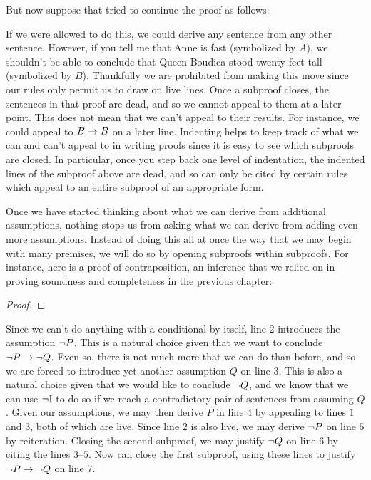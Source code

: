 But now suppose that tried to continue the proof as follows:
\begin{fitchproof}
	 \pr{}
	\open
		 
		 
	\close
	 
\end{fitchproof}
If we were allowed to do this, we could derive any sentence from any other sentence.
However, if you tell me that Anne is fast (symbolized by $A$), we shouldn't be able to conclude that Queen Boudica stood twenty-feet tall (symbolized by $B$).
Thankfully we are prohibited from making this move since our rules only permit us to draw on live lines.
Once a subproof closes, the sentences in that proof are dead, and so we cannot appeal to them at a later point.
This does not mean that we can't appeal to their results.
For instance, we could appeal to $B \rightarrow B$ on a later line. 
Indenting helps to keep track of what we can and can't appeal to in writing proofs since it is easy to see which subproofs are closed.
In particular, once you step back one level of indentation, the indented lines of the subproof above are dead, and so can only be cited by certain rules which appeal to an entire subproof of an appropriate form.

Once we have started thinking about what we can derive from additional assumptions, nothing stops us from asking what we can derive from adding even more assumptions.
Instead of doing this all at once the way that we may begin with many premises, we will do so by opening subproofs within subproofs.
For instance, here is a proof of contraposition, an inference that we relied on in proving soundness and completeness in the previous chapter:

\begin{proof}
     
  \open
     
    \open
       
    \close
     
  \close
\end{proof}

Since we can't do anything with a conditional by itself, line $2$ introduces the assumption $\neg P$.
This is a natural choice given that we want to conclude $\neg P \rightarrow \neg Q$.
Even so, there is not much more that we can do than before, and so we are forced to introduce yet another assumption $Q$ on line $3$. 
This is also a natural choice given that we would like to conclude $\neg Q$, and we know that we can use $\neg$I to do so if we reach a contradictory pair of sentences from assuming $Q$.
Given our assumptions, we may then derive $P$ in line $4$ by appealing to lines $1$ and $3$, both of which are live. 
Since line $2$ is also live, we may derive $\neg P$ on line $5$ by reiteration.
Closing the second subproof, we may justify $\neg Q$ on line $6$ by citing the lines $3$--$5$.
Now can close the first subproof, using these lines to justify $\neg P \rightarrow \neg Q$ on line $7$. 


